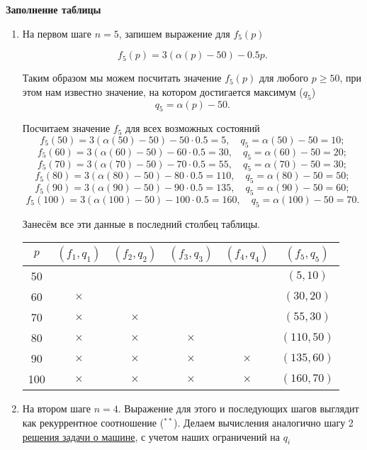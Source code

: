 \bigskip

\textbf{Заполнение таблицы}

\begin{enumerate}[nosep]
	\item[\fbox{\textbf{Шаг 1}}] На первом шаге $n = 5$, запишем выражение для $f_5(p)$
	
	\[
	f_5(p) = 3(\alpha(p) - 50) - 0.5p.
	\]
	
	Таким образом мы можем посчитать значение $f_5(p)$ для любого $p \ge 50$, при этом нам известно значение, на котором достигается максимум ($q_5$)
	\[
	q_5 = \alpha(p) - 50.
	\]
	
	Посчитаем значение $f_5$ для всех возможных состояний
	\[
	f_5(50) = 3(\alpha(50) - 50) - 50\cdot0.5 = 5, \quad q_5 = \alpha(50) - 50 = 10;
	\]
	\[
	f_5(60) = 3(\alpha(60) - 50) - 60\cdot0.5 = 30, \quad q_5 = \alpha(60) - 50 = 20;
	\]
	\[
	f_5(70) = 3(\alpha(70) - 50) - 70\cdot0.5 = 55, \quad q_5 = \alpha(70) - 50 = 30;
	\]
	\[
	f_5(80) = 3(\alpha(80) - 50) - 80\cdot0.5 = 110, \quad q_5 = \alpha(80) - 50 = 50;
	\]
	\[
	f_5(90) = 3(\alpha(90) - 50) - 90\cdot0.5 = 135, \quad q_5 = \alpha(90) - 50 = 60;
	\]
	\[
	f_5(100) = 3(\alpha(100) - 50) - 100\cdot0.5 = 160, \quad q_5 = \alpha(100) - 50 = 70.
	\]
	
	Занесём все эти данные в последний столбец таблицы.
	
	\begin{table}[H]
		\centering
		\begin{tabular}{ | c | c | c | c | c | c | } 
			\hline
			$p$ & $(f_1, q_1)$ & $(f_2, q_2)$ & $(f_3, q_3)$ & $(f_4, q_4)$ & $(f_5, q_5)$ \\ 
			\hline
			50 & & & & & $(5, 10)$ \\\hline
			60 & $\times$ & & & & $(30, 20)$ \\\hline
			70 & $\times$ & $\times$ & & & $(55, 30)$ \\\hline
			80 & $\times$ & $\times$ & $\times$ & & $(110, 50)$ \\\hline
			90 & $\times$ & $\times$ & $\times$ & $\times$ & $(135, 60)$ \\\hline
			100 & $\times$ & $\times$ & $\times$ & $\times$ & $(160, 70)$ \\\hline
		\end{tabular}
	\end{table}
		
	\item[\fbox{\textbf{Шаг 2}}] 
	На втором шаге $n = 4$. Выражение для этого и последующих шагов выглядит как рекуррентное соотношение ($^{**}$). Делаем вычисления аналогично шагу 2 \hyperref[pr:car_on_island]{решения задачи о машине}, с учетом наших ограничений на $q_i$
	

\end{enumerate}
